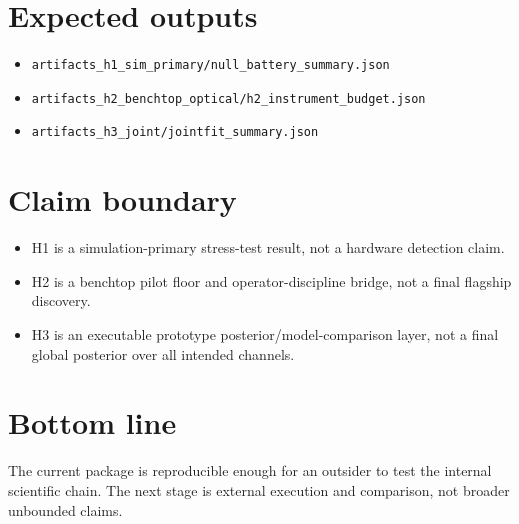 \documentclass[11pt]{article}
\begin{document}
\section*{Expected outputs}
\begin{itemize}
    \item \texttt{artifacts\_h1\_sim\_primary/null\_battery\_summary.json}
    \item \texttt{artifacts\_h2\_benchtop\_optical/h2\_instrument\_budget.json}
    \item \texttt{artifacts\_h3\_joint/jointfit\_summary.json}
\end{itemize}

\section*{Claim boundary}
\begin{itemize}
    \item H1 is a simulation-primary stress-test result, not a hardware detection claim.
    \item H2 is a benchtop pilot floor and operator-discipline bridge, not a final flagship discovery.
    \item H3 is an executable prototype posterior/model-comparison layer, not a final global posterior over all intended channels.
\end{itemize}

\section*{Bottom line}
The current package is reproducible enough for an outsider to test the internal scientific chain. The next stage is external execution and comparison, not broader unbounded claims.
\end{document}
